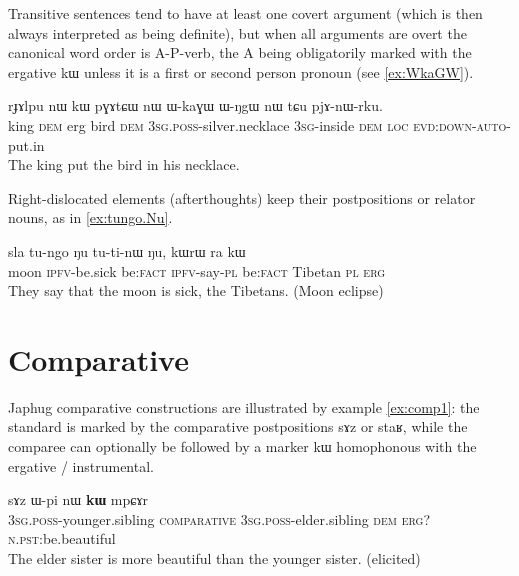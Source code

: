 \documentclass[oldfontcommands,oneside,a4paper,11pt]{article}
\newcommand{\ipa}[1]{{\phon#1}} %
\begin{document}
Transitive sentences tend to have at least one covert argument (which is then always interpreted as being definite), but when all arguments are overt the canonical word order is A-P-verb, the A being obligatorily marked with the ergative \ipa{kɯ} unless it is a first or second person pronoun (see \ref{ex:WkaGW}).

\begin{exe}
\ex \label{ex:WkaGW}
\gll
\ipa{rɟɤlpu} 	\ipa{nɯ} 	\ipa{kɯ} 	\ipa{pɣɤtɕɯ} 	\ipa{nɯ} 	\ipa{ɯ-kaɣɯ} 	\ipa{ɯ-ŋgɯ} 	\ipa{nɯ} 	\ipa{tɕu} 	\ipa{pjɤ-nɯ-rku.} \\
king \textsc{dem} erg bird \textsc{dem} \textsc{3sg.poss}-silver.necklace \textsc{3sg}-inside \textsc{dem} \textsc{loc} \textsc{evd:down-auto}-put.in \\
\glt The king put the bird in his necklace.
\end{exe}

Right-dislocated elements (afterthoughts) keep their postpositions or relator nouns, as in \ref{ex:tungo.Nu}.

\begin{exe}
\ex \label{ex:tungo.Nu}
\gll
\ipa{sla} 	\ipa{tu-ngo} 	\ipa{ŋu} 	\ipa{tu-ti-nɯ} 	\ipa{ŋu,} 	\ipa{kɯrɯ} 	\ipa{ra} 	\ipa{kɯ} \\
moon \textsc{ipfv}-be.sick  be:\textsc{fact} \textsc{ipfv}-say-\textsc{pl}  be:\textsc{fact}  Tibetan \textsc{pl} \textsc{erg} \\
\glt They say that the moon is sick, the Tibetans. (Moon eclipse)
\end{exe}

\section{Comparative}

Japhug comparative constructions are illustrated by example \ref{ex:comp1}: the standard is marked by the comparative postpositions \ipa{sɤz} or \ipa{staʁ}, while the comparee can optionally be followed by a marker \ipa{kɯ} homophonous with the ergative / instrumental.

\begin{exe}
\ex \label{ex:comp1}
\gll  \ipa{ɯ-ʁi}   	\ipa{sɤz}   	\ipa{ɯ-pi}   	\ipa{nɯ}   	\ipa{\textbf{kɯ}}   	\ipa{mpɕɤr}     \\
\textsc{3sg.poss}-younger.sibling \textsc{comparative} \textsc{3sg.poss}-elder.sibling \textsc{dem} \textsc{erg?}  \textsc{n.pst:}be.beautiful \\
\glt The elder sister is more beautiful than the younger sister. (elicited)
\end{exe}
\end{document}
